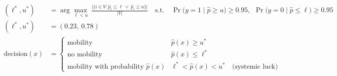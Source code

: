 \begin{align}
(\ell^*, u^*) &= \arg\max_{\ell < u}\ \frac{\bigl|\{i \in V : \hat{p}_i \le \ell \ \lor\ \hat{p}_i \ge u\}\bigr|}{|V|}
\quad \text{s.t.}\quad
\Pr\bigl(y = 1 \mid \hat{p} \ge u\bigr) \ge 0.95,\ \ \Pr\bigl(y = 0 \mid \hat{p} \le \ell\bigr) \ge 0.95 \\
(\ell^*, u^*) &= (0.23,\ 0.78) \\
\text{decision}(x) &= \begin{cases}
\text{mobility} & \hat{p}(x) \ge u^* \\
\text{no mobility} & \hat{p}(x) \le \ell^* \\
\text{mobility with probability } \hat{p}(x) & \ell^* < \hat{p}(x) < u^* \quad \text{(systemic luck)}
\end{cases}
\end{align}
